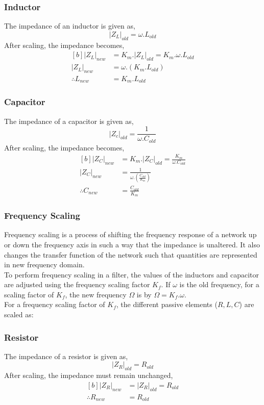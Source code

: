\documentclass{lab_sheet}
\begin{document}
\subsubsection*{Inductor}
The impedance of an inductor is given as, 
$$
|Z_L|_{old}=\omega.L_{old}
$$
After scaling, the impedance becomes,
\begin{equation}
   \begin{aligned}[b]
      |Z_L|_{new}&=K_m.|Z_L|_{old}=K_m.\omega.L_{old}\\
      |Z_L|_{new}&=\omega.(K_m.L_{old})\\
      \therefore L_{new}&=K_m.L_{old}
   \end{aligned}
   \label{eqn:l_mag}
\end{equation}

\subsubsection*{Capacitor}
The impedance of a capacitor is given as, 
$$
|Z_c|_{old}=\frac{1}{\omega.C_{old}}
$$
After scaling, the impedance becomes,
\begin{equation}
   \begin{aligned}[b]
      |Z_C|_{new}&=K_m.|Z_C|_{old}=\frac{K_m}{\omega.C_{old}}\\
      |Z_C|_{new}&=\frac{1}{\omega.\left(\frac{C_{old}}{K_m}\right)}\\
      \therefore C_{new}&=\frac{C_{old}}{K_m}
   \end{aligned}
   \label{eqn:c_mag}
\end{equation}
\subsubsection{Frequency Scaling}
Frequency scaling is a process of shifting the frequency
response of a network up or down the frequency axis in such a way that the impedance is unaltered. It also changes the transfer function of the network such that quantities are represented in new frequency domain.
\\
To perform frequency scaling in  a filter, the values of the inductors and capacitor are adjusted using the frequency scaling factor $K_f$. If $\omega$ is the old frequency, for a scaling factor of $K_f$, the new frequency $\Omega$ is by $\Omega=K_f.\omega$.\\
For a frequency scaling factor of $K_f$, the different passive elements ($R, L, C$) are scaled as:
\subsubsection*{Resistor}
The impedance of a resistor is given as, 
$$
|Z_R|_{old}=R_{old}
$$
After scaling, the impedance must remain unchanged,
\begin{equation}
   \begin{aligned}[b]
      |Z_R|_{new}&=|Z_R|_{old}=R_{old}\\
      \therefore R_{new}&=R_{old}
   \end{aligned}
   \label{eqn:r_freq}
\end{equation}
\end{document}
